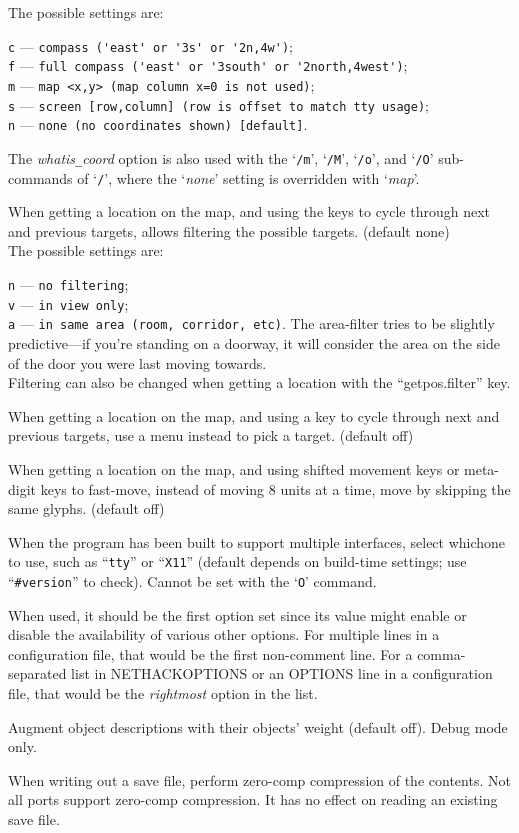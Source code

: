 The possible settings are:

{\tt c} --- \verb#compass ('east' or '3s' or '2n,4w')#;\\
{\tt f} --- \verb#full compass ('east' or '3south' or '2north,4west')#;\\
{\tt m} --- \verb#map <x,y> (map column x=0 is not used)#;\\
{\tt s} --- \verb#screen [row,column] (row is offset to match tty usage)#;\\
{\tt n} --- \verb#none (no coordinates shown) [default]#.

The
{\it whatis\verb+_+coord\/}
option is also used with
the `{\tt /m}', `{\tt /M}', `{\tt /o}', and `{\tt /O}' sub-commands
of `{\tt /}',
where the `{\it none\/}' setting is overridden with `{\it map}'.
\item[\ib{whatis\verb+_+filter}]
When getting a location on the map, and using the keys to cycle through
next and previous targets, allows filtering the possible targets.
(default none)\\
The possible settings are:

{\tt n} --- \verb#no filtering#;\\
{\tt v} --- \verb#in view only#;\\
{\tt a} --- \verb#in same area (room, corridor, etc)#.
The area-filter tries to be slightly
predictive---if
you're standing on a doorway, it will consider the area on the side of
the door you were last moving towards.\\
Filtering can also be changed when getting a location with
the ``getpos.filter'' key.
\item[\ib{whatis\verb+_+menu}]
When getting a location on the map, and using a key to cycle through
next and previous targets, use a menu instead to pick a target.
(default off)
\item[\ib{whatis\verb+_+moveskip}]
When getting a location on the map, and using shifted movement keys or
meta-digit keys to fast-move, instead of moving 8 units at a time,
move by skipping the same glyphs.
(default off)
\item[\ib{windowtype}]
When the program has been built to support multiple interfaces,
select whichone to use, such as ``{\tt tty}'' or ``{\tt X11}''
(default depends on build-time settings; use ``{\tt \#version}'' to check).
Cannot be set with the `{\tt O}' command.

When used, it should be the first option set since its value might
enable or disable the availability of various other options.
For multiple lines in a configuration file, that would be the first
non-comment line.
For a comma-separated list in NETHACKOPTIONS or an OPTIONS line in a
configuration file, that would be the {\it rightmost\/} option in the list.
\item[\ib{wizweight}]
Augment object descriptions with their objects' weight (default off).
Debug mode only.
\item[\ib{zerocomp}]
When writing out a save file, perform zero-comp compression of the
contents. Not all ports support zero-comp compression. It has no effect
on reading an existing save file.
\elist

